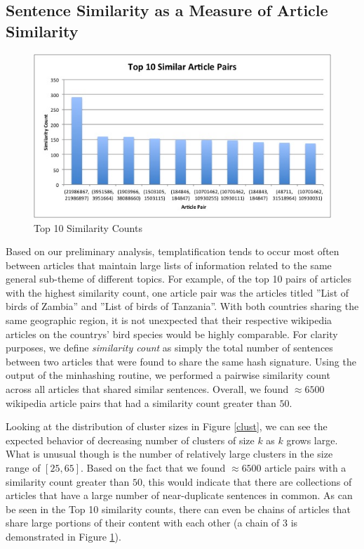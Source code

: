 \documentclass{acm_proc_article-sp}
\begin{document}
\subsection{Sentence Similarity as a Measure of Article Similarity}

\begin{figure}
\begin{center}
\includegraphics[scale=0.43, keepaspectratio = true]{Top10ArticlePairs.jpg}
\end{center}
\caption{Top 10 Similarity Counts}
\label{toparticles}
\end{figure}

Based on our preliminary analysis, templatification tends to occur most often between articles that maintain large lists of information related to the same general sub-theme of different topics. For example, of the top 10 pairs of articles with the highest similarity count, one article pair was the articles titled ''List of birds of Zambia'' and ''List of birds of Tanzania''. With both countries sharing the same geographic region, it is not unexpected that their respective wikipedia articles on the countrys' bird species would be highly comparable. For clarity purposes, we define \emph{similarity count} as simply the total number of sentences between two articles that were found to share the same hash signature. Using the output of the minhashing routine, we performed a pairwise similarity count across all articles that shared similar sentences. Overall, we found $\approx 6500$ wikipedia article pairs that had a similarity count greater than $50$.

Looking at the distribution of cluster sizes in Figure \ref{clust}, we can see the expected behavior of decreasing number of clusters of size $k$ as $k$ grows large. What is unusual though is the number of relatively large clusters in the size range of $[25, 65]$. Based on the fact that we found $\approx 6500$ article pairs with a similarity count greater than $50$, this would indicate that there are collections of articles that have a large number of near-duplicate sentences in common. As can be seen in the Top 10 similarity counts, there can even be chains of articles that share large portions of their content with each other (a chain of 3 is demonstrated in Figure \ref{toparticles}).
\end{document}
